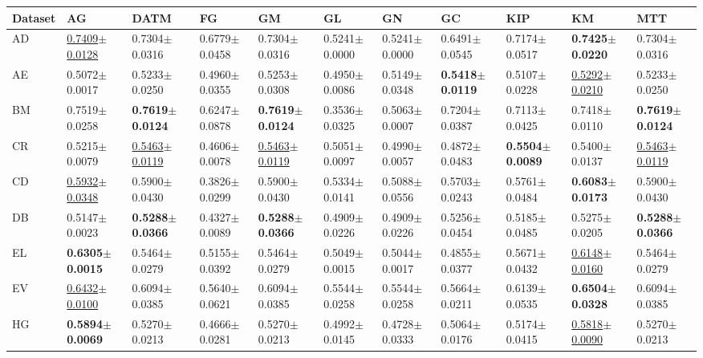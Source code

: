 \begin{tabular}{lllllllllll}
\toprule
Dataset & AG & DATM & FG & GM & GL & GN & GC & KIP & KM & MTT \\
\midrule
AD & \underline{0.7409$\pm$0.0128} & 0.7304$\pm$0.0316 & 0.6779$\pm$0.0458 & 0.7304$\pm$0.0316 & 0.5241$\pm$0.0000 & 0.5241$\pm$0.0000 & 0.6491$\pm$0.0545 & 0.7174$\pm$0.0517 & \textbf{0.7425$\pm$0.0220} & 0.7304$\pm$0.0316 \\
AE & 0.5072$\pm$0.0017 & 0.5233$\pm$0.0250 & 0.4960$\pm$0.0355 & 0.5253$\pm$0.0308 & 0.4950$\pm$0.0086 & 0.5149$\pm$0.0348 & \textbf{0.5418$\pm$0.0119} & 0.5107$\pm$0.0228 & \underline{0.5292$\pm$0.0210} & 0.5233$\pm$0.0250 \\
BM & 0.7519$\pm$0.0258 & \textbf{0.7619$\pm$0.0124} & 0.6247$\pm$0.0878 & \textbf{0.7619$\pm$0.0124} & 0.3536$\pm$0.0325 & 0.5063$\pm$0.0007 & 0.7204$\pm$0.0387 & 0.7113$\pm$0.0425 & 0.7418$\pm$0.0110 & \textbf{0.7619$\pm$0.0124} \\
CR & 0.5215$\pm$0.0079 & \underline{0.5463$\pm$0.0119} & 0.4606$\pm$0.0078 & \underline{0.5463$\pm$0.0119} & 0.5051$\pm$0.0097 & 0.4990$\pm$0.0057 & 0.4872$\pm$0.0483 & \textbf{0.5504$\pm$0.0089} & 0.5400$\pm$0.0137 & \underline{0.5463$\pm$0.0119} \\
CD & \underline{0.5932$\pm$0.0348} & 0.5900$\pm$0.0430 & 0.3826$\pm$0.0299 & 0.5900$\pm$0.0430 & 0.5334$\pm$0.0141 & 0.5088$\pm$0.0556 & 0.5703$\pm$0.0243 & 0.5761$\pm$0.0484 & \textbf{0.6083$\pm$0.0173} & 0.5900$\pm$0.0430 \\
DB & 0.5147$\pm$0.0023 & \textbf{0.5288$\pm$0.0366} & 0.4327$\pm$0.0089 & \textbf{0.5288$\pm$0.0366} & 0.4909$\pm$0.0226 & 0.4909$\pm$0.0226 & 0.5256$\pm$0.0454 & 0.5185$\pm$0.0485 & 0.5275$\pm$0.0205 & \textbf{0.5288$\pm$0.0366} \\
EL & \textbf{0.6305$\pm$0.0015} & 0.5464$\pm$0.0279 & 0.5155$\pm$0.0392 & 0.5464$\pm$0.0279 & 0.5049$\pm$0.0015 & 0.5044$\pm$0.0017 & 0.4855$\pm$0.0377 & 0.5671$\pm$0.0432 & \underline{0.6148$\pm$0.0160} & 0.5464$\pm$0.0279 \\
EV & \underline{0.6432$\pm$0.0100} & 0.6094$\pm$0.0385 & 0.5640$\pm$0.0621 & 0.6094$\pm$0.0385 & 0.5544$\pm$0.0258 & 0.5544$\pm$0.0258 & 0.5664$\pm$0.0211 & 0.6139$\pm$0.0535 & \textbf{0.6504$\pm$0.0328} & 0.6094$\pm$0.0385 \\
HG & \textbf{0.5894$\pm$0.0069} & 0.5270$\pm$0.0213 & 0.4666$\pm$0.0281 & 0.5270$\pm$0.0213 & 0.4992$\pm$0.0145 & 0.4728$\pm$0.0333 & 0.5064$\pm$0.0176 & 0.5174$\pm$0.0415 & \underline{0.5818$\pm$0.0090} & 0.5270$\pm$0.0213 \\

\end{tabular}
